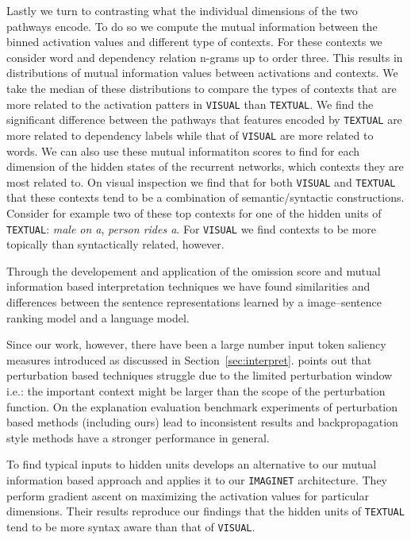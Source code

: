 Lastly we turn to contrasting what the individual dimensions of the two pathways encode.
To do so we compute the mutual information between the binned activation values and different
type of contexts. For these contexts we consider word and dependency relation n-grams up to
order three. This results in distributions of mutual information values between activations and
contexts. We take the median of these distributions to compare the types of contexts that
are more related to the activation patters in  \texttt{VISUAL} than  \texttt{TEXTUAL}. We find
the significant difference between the pathways that features encoded by  \texttt{TEXTUAL} are
more related to dependency labels while that of \texttt{VISUAL} are more related to words.
We can also use these mutual informatiton scores to find for each dimension of the hidden states
of the recurrent networks, which contexts they are most related to. 
On visual inspection we find that  for both 
\texttt{VISUAL} and \texttt{TEXTUAL} that these contexts
tend to be a combination of semantic/syntactic constructions. Consider for example two of these
top contexts for one of the hidden units of  \texttt{TEXTUAL}: \emph{male on a}, \emph{person rides a}.
For \texttt{VISUAL} we find contexts to be more topically than syntactically related, however.

Through the developement and application of the omission score and 
mutual information based interpretation techniques we have found similarities and differences between
the sentence representations learned by a image--sentence ranking model 
and a language model. 

Since our work, however, there have been a large number input token saliency 
measures introduced as discussed in Section~\ref{sec:interpret}. \cite{shrikumar2017learning}
points out that perturbation based techniques struggle due to the limited perturbation window i.e.: the
important context might be larger than the scope of the perturbation function. 
On the explanation evaluation benchmark experiments of \cite{poerner2018evaluating} 
perturbation based methods (including ours) lead to inconsistent results and backpropagation style
methods \citep{bach2015pixel,shrikumar2017learning} have a stronger performance in general.

To find typical inputs to hidden units \cite{poerner2018interpretable} develops an alternative
to our mutual information based approach and applies it to our \texttt{IMAGINET} architecture.
They perform gradient ascent on maximizing the activation values for particular dimensions.
Their results reproduce our findings that the hidden units of \texttt{TEXTUAL} tend to be more 
syntax aware than that of \texttt{VISUAL}.

